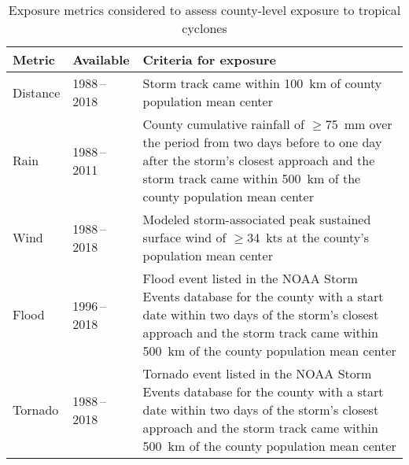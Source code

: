 \begin{table}%
\centering 
\caption{Exposure metrics considered to assess county-level exposure to 
tropical cyclones}
\begin{tabular}{p{1.5cm}p{2.5cm}p{10cm}} 
\toprule
Metric & Available & Criteria for exposure \\ \midrule 
Distance & 1988\,--\,2018 & Storm track came within 100~\si{\kilo\metre} of county population mean center\\ 
Rain & 1988\,--\,2011 & County cumulative rainfall of $\ge$75~\si{\milli\metre} over the period from two days before to 
one day after the storm's closest approach and the storm track came within 500~\si{\kilo\metre} of the county population mean center\\ 
Wind & 1988\,--\,2018 & Modeled storm-associated peak sustained surface wind of $\ge$34~kts 
at the county's population mean center\\ 
Flood & 1996\,--\,2018 & Flood event listed in the \ac{NOAA} Storm Events database for the county with a start date within two days of the storm's closest approach and the storm track came within 500~\si{\kilo\metre} of the county population mean center \\
Tornado & 1988\,--\,2018 & Tornado event listed in the \ac{NOAA} Storm Events database for the county with a start date within two days of the storm's closest approach and the storm track came within 500~\si{\kilo\metre} of the county population mean center\\
\bottomrule 
\end{tabular} 
\label{tab:exposuremetrics} 
\end{table}

\clearpage


